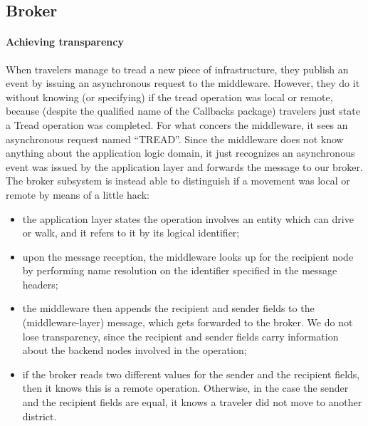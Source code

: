 \subsection{Broker}\label{sec:impl-broker}

\paragraph{Achieving transparency}

When travelers manage to tread a new piece of infrastructure, they publish an
event by issuing an asynchronous request to the middleware. However, they do it
without knowing (or specifying) if the tread operation was local or remote,
because (despite the qualified name of the Callbacks package) travelers just
state a Tread operation was completed.
For what concers the middleware, it sees an asynchronous request named
``TREAD''. Since the middleware does not know anything about the application
logic domain, it just recognizes an asynchronous event was issued by the
application layer and forwards the message to our broker.
The broker subsystem is instead able to distinguish if a movement was local or
remote by means of a little hack:

\begin{itemize}
  \item the application layer states the operation involves an entity which can
  drive or walk, and it refers to it by its logical identifier;
  \item upon the message reception, the middleware looks up for the recipient
    node by performing name resolution on the identifier specified in the
    message headers;
  \item the middleware then appends the recipient and sender fields to the
    (middleware-layer) message, which gets forwarded to the broker. We do not
    lose transparency, since the recipient and sender fields carry information
    about the backend nodes involved in the operation;
  \item if the broker reads two different values for the sender and the
    recipient fields, then it knows this is a remote operation.
    Otherwise, in the
    case the sender and the recipient fields are equal, it knows a traveler did
    not move to another district.
\end{itemize}
